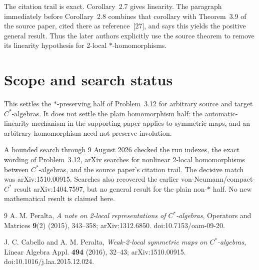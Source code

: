 \documentclass[11pt]{article}
\begin{document}
The citation trail is exact.  Corollary~2.7 gives linearity.  The paragraph
immediately before Corollary~2.8 combines that corollary with Theorem~3.9 of
the source paper, cited there as reference~[27], and says this yields the
positive general result.  Thus the later authors explicitly use the source
theorem to remove its linearity hypothesis for 2-local $*$-homomorphisms.

\section{Scope and search status}

This settles the $*$-preserving half of Problem~3.12 for arbitrary source and
target $C^*$-algebras.  It does not settle the plain homomorphism half:
the automatic-linearity mechanism in the supporting paper applies to
symmetric maps, and an arbitrary homomorphism need not preserve involution.

A bounded search through 9 August 2026 checked the run indexes, the exact
wording of Problem~3.12, arXiv searches for nonlinear 2-local homomorphisms
between $C^*$-algebras, and the source paper's citation trail.  The decisive
match was arXiv:1510.00915.  Searches also recovered the earlier
von-Neumann/compact-$C^*$ result arXiv:1404.7597, but no general result for
the plain non-$*$ half.  No new mathematical result is claimed here.

\begin{thebibliography}{9}
A. M. Peralta,
\emph{A note on 2-local representations of $C^*$-algebras},
Operators and Matrices \textbf{9}(2) (2015), 343--358;
arXiv:1312.6850.  doi:10.7153/oam-09-20.

J. C. Cabello and A. M. Peralta,
\emph{Weak-2-local symmetric maps on $C^*$-algebras},
Linear Algebra Appl. \textbf{494} (2016), 32--43;
arXiv:1510.00915.  doi:10.1016/j.laa.2015.12.024.
\end{thebibliography}
\end{document}
